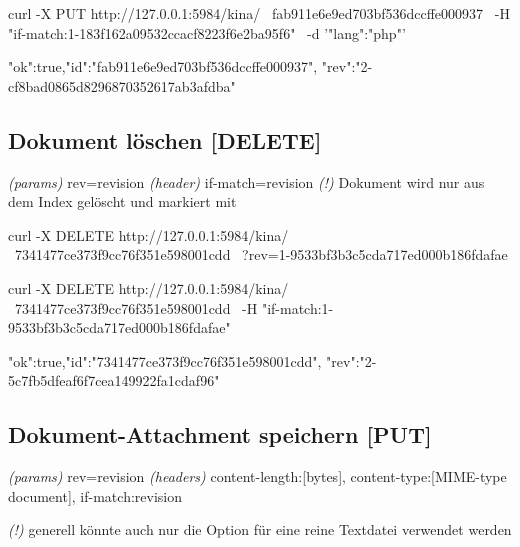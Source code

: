 \documentclass[19pt,landscape,twocolumn]{article}
\newcommand{\mono}[1]{\texttt{\textendash\textendash {#1}}}
\newcommand{\htmlverb}[1]{{[}\textbf{{#1}}{]}}
\newcommand{\brackets}[1]{{[}{#1}{]}}
\newcommand{\setparskip}{\setlength{\parskip}{-6mm}}
\newcommand{\resetparskip}{\setlength{\parskip}{1mm}}
\begin{document}
\begin{code}
curl -X PUT http://127.0.0.1:5984/kina/ \
  fab911e6e9ed703bf536dccffe000937 \
  -H "if-match:1-183f162a09532ccacf8223f6e2ba95f6" \
  -d '{"lang":"php"}'
\end{code}
\setparskip
\begin{response}
{"ok":true,"id":"fab911e6e9ed703bf536dccffe000937",
 "rev":"2-cf8bad0865d8296870352617ab3afdba"}
\end{response}
\resetparskip

\subsection{Dokument löschen \htmlverb{DELETE}}
\emph{(params)} rev=revision \newline
\emph{(header)} if-match=revision \newline
\emph{(!)} Dokument wird nur aus dem Index gelöscht und markiert \newline
 mit \mono{deleted:true}

\begin{code}
curl -X DELETE http://127.0.0.1:5984/kina/ \
  7341477ce373f9cc76f351e598001cdd \
  ?rev=1-9533bf3b3c5cda717ed000b186fdafae
\end{code}

\begin{code}
curl -X DELETE http://127.0.0.1:5984/kina/ \
  7341477ce373f9cc76f351e598001cdd \
  -H "if-match:1-9533bf3b3c5cda717ed000b186fdafae"
\end{code}
\setparskip
\begin{response}
{"ok":true,"id":"7341477ce373f9cc76f351e598001cdd",
 "rev":"2-5c7fb5dfeaf6f7cea149922fa1cdaf96"}
\end{response}
\resetparskip

\subsection{Dokument-Attachment speichern \htmlverb{PUT}}
\emph{(params)} rev=revision \newline
\emph{(headers)} content-length:\brackets{bytes}, content-type:\brackets{MIME-type document}, if-match:revision

\emph{(!)} generell könnte auch nur die Option \mono{data} für eine reine Textdatei \newline
verwendet werden
\end{document}
